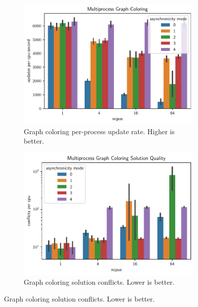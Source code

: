 \begin{figure}[thpb]
      \centering
      
    \begin{subfigure}[b]{\linewidth}
    \centering
    \includegraphics[width=\linewidth]{chart/multiprocess-graph-coloring}
    \caption{Graph coloring per-process update rate. Higher is better.}
    \label{fig:multiprocess_graph_coloring_update_rate}
    \end{subfigure}
    
    \begin{subfigure}[b]{\linewidth}
      \centering
      \includegraphics[width=\linewidth]{chart/multiprocess-graph-coloring-solution-quality} 
      \caption{Graph coloring solution conflicts. Lower is better.}
      \label{fig:multiprocess_graph_coloring_solution_quality}
    \end{subfigure}


\end{figure}
